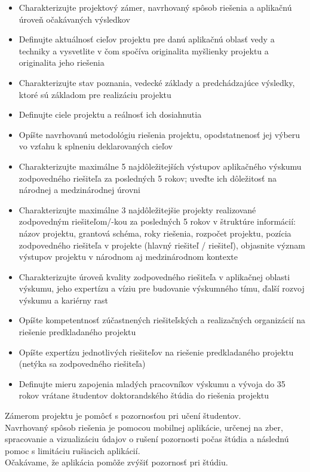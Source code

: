 \documentclass[10pt,slovak,a4paper]{article}
\begin{document}
\begin{itemize}
\item Charakterizujte projektový zámer, navrhovaný spôsob riešenia a aplikačnú úroveň
očakávaných výsledkov
\item Definujte aktuálnosť cieľov projektu pre danú aplikačnú oblasť vedy a techniky
a vysvetlite v čom spočíva originalita myšlienky projektu a originalita jeho riešenia
\item Charakterizujte stav poznania, vedecké základy a predchádzajúce výsledky,
ktoré sú základom pre realizáciu projektu
\item Definujte ciele projektu a reálnosť ich dosiahnutia
\item Opíšte navrhovanú metodológiu riešenia projektu, opodstatnenosť jej výberu vo vzťahu
k splneniu deklarovaných cieľov
\item Charakterizujte maximálne 5 najdôležitejších výstupov aplikačného výskumu
zodpovedného riešiteľa za posledných 5 rokov; uveďte ich dôležitosť na národnej
a medzinárodnej úrovni
\item Charakterizujte maximálne 3 najdôležitejšie projekty realizované zodpovedným
riešiteľom/-kou za posledných 5 rokov v štruktúre informácií: názov projektu, grantová
schéma, roky riešenia, rozpočet projektu, pozícia zodpovedného riešiteľa v projekte
(hlavný riešiteľ / riešiteľ), objasnite význam výstupov projektu v národnom
aj medzinárodnom kontexte
\item Charakterizujte úroveň kvality zodpovedného riešiteľa v aplikačnej oblasti výskumu,
jeho expertízu a víziu pre budovanie výskumného tímu, ďalší rozvoj výskumu a kariérny
rast
\item Opíšte kompetentnosť zúčastnených riešiteľských a realizačných organizácií
na riešenie predkladaného projektu
\item Opíšte expertízu jednotlivých riešiteľov na riešenie predkladaného projektu
(netýka sa zodpovedného riešiteľa)
\item Definujte mieru zapojenia mladých pracovníkov výskumu a vývoja do 35 rokov vrátane
študentov doktorandského štúdia do riešenia projektu
\end{itemize}
 
Zámerom projektu je pomôcť s pozornosťou pri učení študentov.\\
Navrhovaný spôsob riešenia je pomocou mobilnej aplikácie, určenej na zber, \\
spracovanie a vizualizáciu údajov o rušení pozornosti počas štúdia a následnú pomoc s limitáciu rušiacich aplikácií.\\
Očakávame, že aplikácia pomôže zvýšiť pozornosť pri štúdiu.  \\
\end{document}
